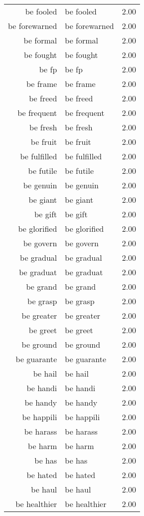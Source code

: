 \begin{table}[ht]
\begin{tabular}{rlr}
  be fooled & be fooled & 2.00 \\ 
  be forewarned & be forewarned & 2.00 \\ 
  be formal & be formal & 2.00 \\ 
  be fought & be fought & 2.00 \\ 
  be fp & be fp & 2.00 \\ 
  be frame & be frame & 2.00 \\ 
  be freed & be freed & 2.00 \\ 
  be frequent & be frequent & 2.00 \\ 
  be fresh & be fresh & 2.00 \\ 
  be fruit & be fruit & 2.00 \\ 
  be fulfilled & be fulfilled & 2.00 \\ 
  be futile & be futile & 2.00 \\ 
  be genuin & be genuin & 2.00 \\ 
  be giant & be giant & 2.00 \\ 
  be gift & be gift & 2.00 \\ 
  be glorified & be glorified & 2.00 \\ 
  be govern & be govern & 2.00 \\ 
  be gradual & be gradual & 2.00 \\ 
  be graduat & be graduat & 2.00 \\ 
  be grand & be grand & 2.00 \\ 
  be grasp & be grasp & 2.00 \\ 
  be greater & be greater & 2.00 \\ 
  be greet & be greet & 2.00 \\ 
  be ground & be ground & 2.00 \\ 
  be guarante & be guarante & 2.00 \\ 
  be hail & be hail & 2.00 \\ 
  be handi & be handi & 2.00 \\ 
  be handy & be handy & 2.00 \\ 
  be happili & be happili & 2.00 \\ 
  be harass & be harass & 2.00 \\ 
  be harm & be harm & 2.00 \\ 
  be has & be has & 2.00 \\ 
  be hated & be hated & 2.00 \\ 
  be haul & be haul & 2.00 \\ 
  be healthier & be healthier & 2.00 \\ 

\end{tabular}
\end{table}
